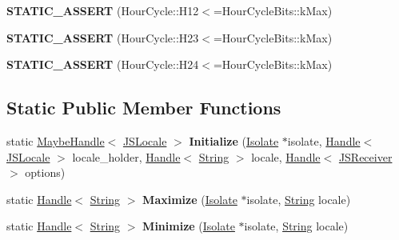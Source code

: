 \begin{DoxyCompactItemize}
\item 
\mbox{\label{classv8_1_1internal_1_1JSLocale_a1e6a47a847f0d19c370349041e70db5e}} 
{\bfseries S\+T\+A\+T\+I\+C\+\_\+\+A\+S\+S\+E\+RT} (Hour\+Cycle\+::\+H12$<$=Hour\+Cycle\+Bits\+::k\+Max)
\item 
\mbox{\label{classv8_1_1internal_1_1JSLocale_ae51b047dc323d6b3ff0c5fae82a9040b}} 
{\bfseries S\+T\+A\+T\+I\+C\+\_\+\+A\+S\+S\+E\+RT} (Hour\+Cycle\+::\+H23$<$=Hour\+Cycle\+Bits\+::k\+Max)
\item 
\mbox{\label{classv8_1_1internal_1_1JSLocale_a1cb6cacd5cd60db3f61864686658a7ee}} 
{\bfseries S\+T\+A\+T\+I\+C\+\_\+\+A\+S\+S\+E\+RT} (Hour\+Cycle\+::\+H24$<$=Hour\+Cycle\+Bits\+::k\+Max)
\end{DoxyCompactItemize}
\subsection*{Static Public Member Functions}
\begin{DoxyCompactItemize}
\item 
\mbox{\label{classv8_1_1internal_1_1JSLocale_aedccc0c7514c95682811a7f734b3446c}} 
static \mbox{\hyperlink{classv8_1_1internal_1_1MaybeHandle}{Maybe\+Handle}}$<$ \mbox{\hyperlink{classv8_1_1internal_1_1JSLocale}{J\+S\+Locale}} $>$ {\bfseries Initialize} (\mbox{\hyperlink{classv8_1_1internal_1_1Isolate}{Isolate}} $\ast$isolate, \mbox{\hyperlink{classv8_1_1internal_1_1Handle}{Handle}}$<$ \mbox{\hyperlink{classv8_1_1internal_1_1JSLocale}{J\+S\+Locale}} $>$ locale\+\_\+holder, \mbox{\hyperlink{classv8_1_1internal_1_1Handle}{Handle}}$<$ \mbox{\hyperlink{classv8_1_1internal_1_1String}{String}} $>$ locale, \mbox{\hyperlink{classv8_1_1internal_1_1Handle}{Handle}}$<$ \mbox{\hyperlink{classv8_1_1internal_1_1JSReceiver}{J\+S\+Receiver}} $>$ options)
\item 
\mbox{\label{classv8_1_1internal_1_1JSLocale_af600b74409b741ac12ccf760b49aecc4}} 
static \mbox{\hyperlink{classv8_1_1internal_1_1Handle}{Handle}}$<$ \mbox{\hyperlink{classv8_1_1internal_1_1String}{String}} $>$ {\bfseries Maximize} (\mbox{\hyperlink{classv8_1_1internal_1_1Isolate}{Isolate}} $\ast$isolate, \mbox{\hyperlink{classv8_1_1internal_1_1String}{String}} locale)
\item 
\mbox{\label{classv8_1_1internal_1_1JSLocale_ab905c08dcdc8f5a309bd4e24982d5940}} 
static \mbox{\hyperlink{classv8_1_1internal_1_1Handle}{Handle}}$<$ \mbox{\hyperlink{classv8_1_1internal_1_1String}{String}} $>$ {\bfseries Minimize} (\mbox{\hyperlink{classv8_1_1internal_1_1Isolate}{Isolate}} $\ast$isolate, \mbox{\hyperlink{classv8_1_1internal_1_1String}{String}} locale)
\end{DoxyCompactItemize}
